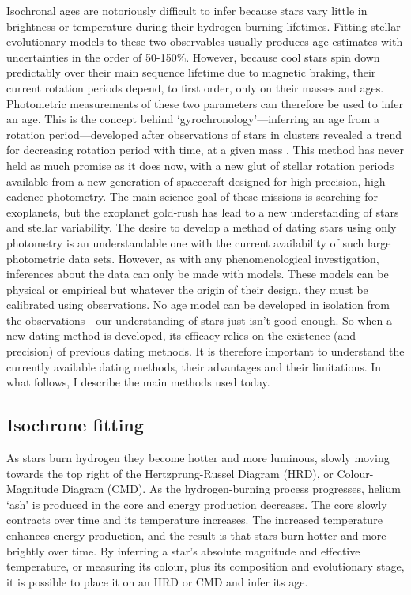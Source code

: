 Isochronal ages are notoriously difficult to infer because stars vary little
in brightness or temperature during their hydrogen-burning lifetimes.
Fitting stellar evolutionary models to these two observables usually produces
age estimates with uncertainties in the order of 50-150\%.
However, because cool stars spin down predictably over their main sequence
lifetime due to magnetic braking, their current rotation periods depend, to
first order, only on their masses and ages.
Photometric measurements of these two parameters can therefore be used to
infer an age.
This is the concept behind `gyrochronology'---inferring an age from a rotation
period---developed after observations of stars in clusters revealed a trend
for decreasing rotation period with time, at a given mass \citep{Weber1967,
Skumanich1972, Barnes2003, Irwin2009}.
This method has never held as much promise as it does now, with a new glut of
stellar rotation periods available from a new generation of spacecraft
designed for high precision, high cadence photometry.
The main science goal of these missions is searching for exoplanets, but the
exoplanet gold-rush has lead to a new understanding of stars and stellar
variability.
The desire to develop a method of dating stars using only photometry is an
understandable one with the current availability of such large photometric
data sets.
However, as with any phenomenological investigation, inferences about the data
can only be made with models.
These models can be physical or empirical but whatever the origin of their
design, they must be calibrated using observations.
No age model can be developed in isolation from the observations---our
understanding of stars just isn't good enough.
So when a new dating method is developed, its efficacy relies on the existence
(and precision) of previous dating methods.
It is therefore important to understand the currently available dating
methods, their advantages and their limitations.
In what follows, I describe the main methods used today.

\subsection{Isochrone fitting}

As stars burn hydrogen they become hotter and more luminous, slowly moving
towards the top right of the Hertzprung-Russel Diagram (HRD), or
Colour-Magnitude Diagram (CMD).
As the hydrogen-burning process progresses, helium `ash' is produced in the
core and energy production decreases.
The core slowly contracts over time and its temperature increases.
The increased temperature enhances energy production, and the result is that
stars burn hotter and more brightly over time.
By inferring a star's absolute magnitude and effective temperature, or
measuring its colour, plus its composition and evolutionary stage, it is
possible to place it on an HRD or CMD and infer its age.

